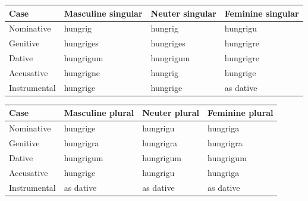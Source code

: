 \par\begingroup
\fontsize{10.5}{13.2}\selectfont
\setlength{\LTleft}{0pt}\setlength{\LTright}{\fill}
\noindent
\begin{tabular}{@{}>{\raggedright\arraybackslash}p{22.0mm}>{\raggedright\arraybackslash}p{31.188mm}>{\raggedright\arraybackslash}p{31.188mm}>{\raggedright\arraybackslash}p{31.188mm}@{}}
\toprule
\textbf{Case} & \textbf{Masculine singular} & \textbf{Neuter singular} & \textbf{Feminine singular} \\
\midrule
Nominative & hungrig & hungrig & hungrigu \\
Genitive & hungriges & hungriges & hungrigre \\
Dative & hungrigum & hungrigum & hungrigre \\
Accusative & hungrigne & hungrig & hungrige \\
Instrumental & hungrige & hungrige & as dative \\
\bottomrule
\end{tabular}
\par\endgroup
\par\addvspace{5pt}
\par\begingroup
\fontsize{10.5}{13.2}\selectfont
\setlength{\LTleft}{0pt}\setlength{\LTright}{\fill}
\noindent
\begin{tabular}{@{}>{\raggedright\arraybackslash}p{22.0mm}>{\raggedright\arraybackslash}p{31.188mm}>{\raggedright\arraybackslash}p{31.188mm}>{\raggedright\arraybackslash}p{31.188mm}@{}}
\toprule
\textbf{Case} & \textbf{Masculine plural} & \textbf{Neuter plural} & \textbf{Feminine plural} \\
\midrule
Nominative & hungrige & hungrigu & hungriga \\
Genitive & hungrigra & hungrigra & hungrigra \\
Dative & hungrigum & hungrigum & hungrigum \\
Accusative & hungrige & hungrigu & hungriga \\
Instrumental & as dative & as dative & as dative \\
\bottomrule
\end{tabular}
\par\endgroup

